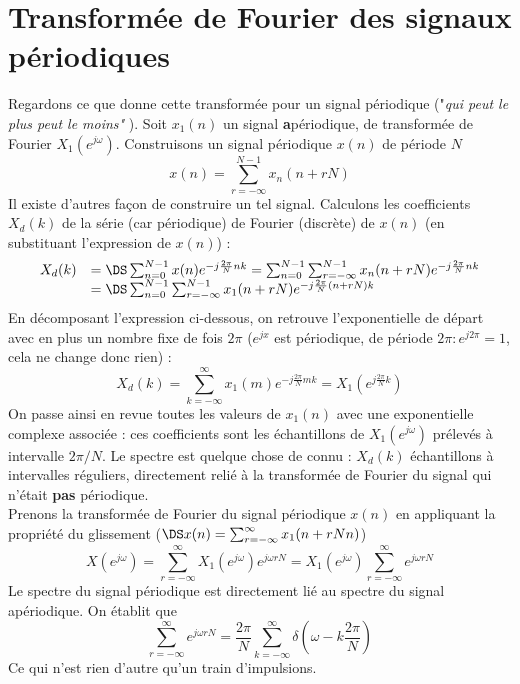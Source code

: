 \section{Transformée de Fourier des signaux périodiques}
Regardons ce que donne cette transformée pour un signal périodique ("\textit{qui peut le plus peut 
le moins" }). Soit $x_1(n)$ un signal \textbf{a}périodique, de transformée de Fourier $X_1(e^{j\omega})$.
Construisons un signal périodique $x(n)$ de période $N$ 
\begin{equation}
x(n) = \sum_{r=-\infty}^{N-1} x_n(n+rN)
\end{equation}
Il existe d'autres façon de construire un tel signal. Calculons les coefficients $X_d(k)$ de la 
série (car périodique) de Fourier (discrète) de $x(n)$ (en substituant l'expression de $x(n)$) :
\begin{equation}
\begin{array}{ll}
X_d(k) &=\DS \sum_{n=0}^{N-1} x(n) e^{-j\frac{2\pi}{N}nk} = \sum_{n=0}^{N-1}\sum_{r=-\infty}^{N-1} x_n(n+rN)
 e^{-j\frac{2\pi}{N}nk}\\
 &=\DS \sum_{n=0}^{N-1}\sum_{r=-\infty}^{N-1} x_1(n+rN) e^{-j\frac{2\pi}{N}(n+rN)k}
 \end{array}
\end{equation}
En décomposant l'expression ci-dessous, on retrouve l'exponentielle de départ avec en plus un
nombre fixe de fois $2\pi$ ($e^{jx}$ est périodique, de période $2\pi : e^{j2\pi}=1$, cela ne 
change donc rien) :
\begin{equation}
X_d(k) = \sum_{k=-\infty}^\infty x_1(m)e^{-j\frac{2\pi}{N}mk} = X_1(e^{j\frac{2\pi}{N}k})
\end{equation}
On passe ainsi en revue toutes les valeurs de $x_1(n)$ avec une exponentielle complexe associée : 
ces coefficients sont les échantillons de $X_1(e^{j\omega})$ prélevés à intervalle $2\pi/N$. Le 
spectre est quelque chose de connu : $X_d(k)$ échantillons à intervalles réguliers, directement 
relié à la transformée de Fourier du signal qui n'était \textbf{pas} périodique.\\

Prenons la transformée de Fourier du signal périodique $x(n)$ en appliquant la propriété du 
glissement ($\DS x(n) = \sum_{r=-\infty}^\infty x_1(n+rNn)$)
\begin{equation}
X(e^{j\omega}) = \sum_{r=-\infty}^\infty X_1(e^{j\omega})e^{j\omega rN} = X_1(e^{j\omega})\sum_{
r=-\infty}^\infty e^{j\omega rN}
\end{equation}
Le spectre du signal périodique est directement lié au spectre du signal apériodique. On établit que
\begin{equation}
\sum_{r=-\infty}^\infty e^{j\omega rN} = \dfrac{2\pi}{N}\sum_{k=-\infty}^\infty \delta\left(
\omega-k\dfrac{2\pi}{N}\right)
\end{equation}
Ce qui n'est rien d'autre qu'un train d'impulsions.\\

